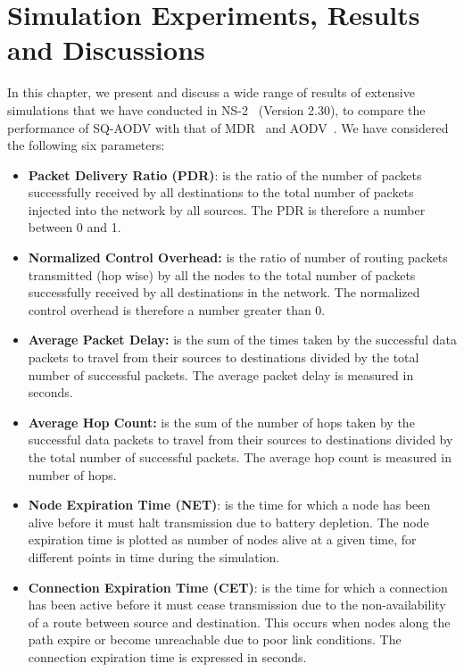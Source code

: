 \chapter{Simulation Experiments, Results and Discussions}
\label{simulations}

In this chapter, we present and discuss a wide range of results of extensive simulations that we have conducted in NS-2~\cite{NS-2} (Version 2.30), to compare the performance of SQ-AODV with that of MDR~\cite{mdr} and AODV~\cite{aodv}. We have considered the following six parameters:

\begin{itemize}
\item \textbf{Packet Delivery Ratio (PDR)}: is the ratio of the number of packets successfully received
by all destinations to the total number of packets injected into the network by all sources. The PDR is
therefore a number between 0 and 1.

\item \textbf{Normalized Control Overhead:} is the ratio of number of routing packets transmitted 
(hop wise) by all the nodes to the total number of packets successfully received by all destinations in the 
network. The normalized control overhead is therefore a number greater than 0.

\item \textbf{Average Packet Delay:} is the sum of the times taken by the successful data packets to 
travel from their sources to destinations divided by the total number of successful packets. The average packet delay 
is measured in seconds.

\item \textbf{Average Hop Count:} is the sum of the number of hops taken by the successful data packets to 
travel from their sources to destinations divided by the total number of successful packets. The average hop count  
is measured in number of hops.

\item \textbf{Node Expiration Time (NET)}: is the time for which a node has been alive before it must halt transmission due to battery depletion. The node expiration time is plotted as number of nodes alive at a given time, for different points in time during the simulation.

\item \textbf{Connection Expiration Time (CET)}: is the time for which a connection has been active before it must cease transmission due to the non-availability of a route between source and destination.
This occurs when nodes along the path expire or become unreachable due to poor link conditions. The connection expiration time is expressed in seconds.
\end{itemize}

